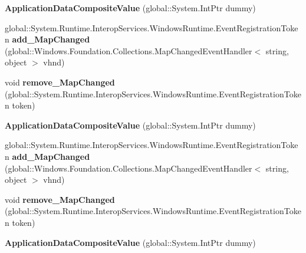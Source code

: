 \begin{DoxyCompactItemize}
{\bfseries Application\+Data\+Composite\+Value} (global\+::\+System.\+Int\+Ptr dummy)
\item 
\mbox{\label{class_windows_1_1_storage_1_1_application_data_composite_value_a1c91f78248cdfefd48dbb74e8c6cbcae}} 
global\+::\+System.\+Runtime.\+Interop\+Services.\+Windows\+Runtime.\+Event\+Registration\+Token {\bfseries add\+\_\+\+Map\+Changed} (global\+::\+Windows.\+Foundation.\+Collections.\+Map\+Changed\+Event\+Handler$<$ string, object $>$ vhnd)
\item 
\mbox{\label{class_windows_1_1_storage_1_1_application_data_composite_value_a38756e63852d3bb4fa2a5e28b2db18be}} 
void {\bfseries remove\+\_\+\+Map\+Changed} (global\+::\+System.\+Runtime.\+Interop\+Services.\+Windows\+Runtime.\+Event\+Registration\+Token token)
\item 
\mbox{\label{class_windows_1_1_storage_1_1_application_data_composite_value_a687a19ee159649de2153e9c15280a883}} 
{\bfseries Application\+Data\+Composite\+Value} (global\+::\+System.\+Int\+Ptr dummy)
\item 
\mbox{\label{class_windows_1_1_storage_1_1_application_data_composite_value_a1c91f78248cdfefd48dbb74e8c6cbcae}} 
global\+::\+System.\+Runtime.\+Interop\+Services.\+Windows\+Runtime.\+Event\+Registration\+Token {\bfseries add\+\_\+\+Map\+Changed} (global\+::\+Windows.\+Foundation.\+Collections.\+Map\+Changed\+Event\+Handler$<$ string, object $>$ vhnd)
\item 
\mbox{\label{class_windows_1_1_storage_1_1_application_data_composite_value_a38756e63852d3bb4fa2a5e28b2db18be}} 
void {\bfseries remove\+\_\+\+Map\+Changed} (global\+::\+System.\+Runtime.\+Interop\+Services.\+Windows\+Runtime.\+Event\+Registration\+Token token)
\item 
\mbox{\label{class_windows_1_1_storage_1_1_application_data_composite_value_a687a19ee159649de2153e9c15280a883}} 
{\bfseries Application\+Data\+Composite\+Value} (global\+::\+System.\+Int\+Ptr dummy)

\end{DoxyCompactItemize}

